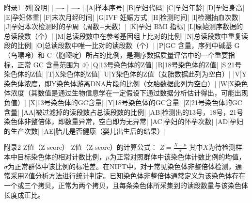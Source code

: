 附录1
|列|说明|
| ---- | ---- |
|A|样本序号|
|B|孕妇代码|
|C|孕妇年龄|
|D|孕妇身高|
|E|孕妇体重|
|F|末次月经时间|
|G|IVF 妊娠方式|
|H|检测时间|
|I|检测抽血次数|
|J|孕妇本次检测时的孕周（周数+天数）|
|K|孕妇 BMI 指标|
|L|原始测序数据的总读段数（个）|
|M|总读段数中在参考基因组上比对的比例|
|N|总读段数中重复读段的比例|
|O|总读段数中唯一比对的读段数（个）|
|P|GC 含量，序列中碱基 G（鸟嘌呤）和 C（胞嘧啶）所占的比例，是测序数据质量评估中的一个重要指标，正常 GC 含量范围为 40%
|Q|13号染色体的Z值|
|R|18号染色体的Z值|
|S|21号染色体的Z值|
|T|X染色体的Z值|
|U|Y染色体的Z值（女胎数据此列为空白）|
|V|Y染色体浓度，即Y染色体游离DNA片段的比例（女胎数据此列为空白）|
|W|X染色体浓度（其数值是通过生物信息学在一定假设下通过数据分析估计得出，可能出现负值）|
|X|13号染色体的GC含量|
|Y|18号染色体的GC含量|
|Z|21号染色体的GC含量|
|AA|被过滤掉的读段数占总读段数的比例|
|AB|检测出的13号，18号，21号染色体非整倍体，即数量异常，空白即为无异常|
|AC|孕妇的怀孕次数|
|AD|孕妇的生产次数|
|AE|胎儿是否健康（婴儿出生后的结果）|

附录2
Z值（Z-score）
Z值（Z-score）的计算公式：
$Z = \frac{X - \mu}{\sigma}$
其中$X$为待检测样本中目标染色体的相对计数比例，$\mu$为正常对照群体中该染色体计数比例的均值，$\sigma$为正常群体中该比例的标准差。在NIPT中，对于常见染色体非整倍体检测，通常采用Z值分析方法进行统计判定。已知染色体非整倍体通常定义为该染色体存在一个或三个拷贝，正常为两个拷贝，且每条染色体所采集到的读段数量与该染色体长度成正比。


